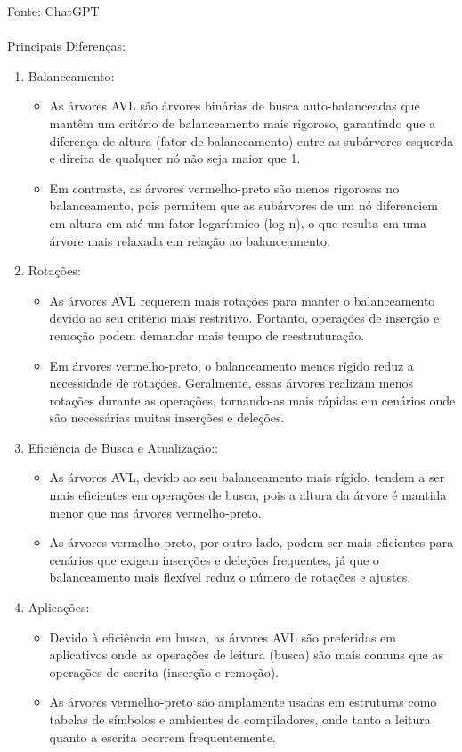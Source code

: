 \documentclass{article}
\begin{document}
Fonte: ChatGPT
\\
\\Principais Diferenças:
  \begin{enumerate}[label=\alph*)]
    \item Balanceamento: 
    \begin{itemize}
      \item As árvores AVL são árvores binárias de busca auto-balanceadas que mantêm um critério de balanceamento mais rigoroso, garantindo que a diferença de altura (fator de balanceamento) entre as subárvores esquerda e direita de qualquer nó não seja maior que 1.
      \item Em contraste, as árvores vermelho-preto são menos rigorosas no balanceamento, pois permitem que as subárvores de um nó diferenciem em altura em até um fator logarítmico (log n), o que resulta em uma árvore mais relaxada em relação ao balanceamento.
    \end{itemize}
    \item Rotações:
      \begin{itemize}
        \item As árvores AVL requerem mais rotações para manter o balanceamento devido ao seu critério mais restritivo. Portanto, operações de inserção e remoção podem demandar mais tempo de reestruturação.
        \item Em árvores vermelho-preto, o balanceamento menos rígido reduz a necessidade de rotações. Geralmente, essas árvores realizam menos rotações durante as operações, tornando-as mais rápidas em cenários onde são necessárias muitas inserções e deleções.
      \end{itemize}
    \item Eficiência de Busca e Atualização::
      \begin{itemize}
        \item As árvores AVL, devido ao seu balanceamento mais rígido, tendem a ser mais eficientes em operações de busca, pois a altura da árvore é mantida menor que nas árvores vermelho-preto.
        \item As árvores vermelho-preto, por outro lado, podem ser mais eficientes para cenários que exigem inserções e deleções frequentes, já que o balanceamento mais flexível reduz o número de rotações e ajustes.
      \end{itemize}
    \item Aplicações:
      \begin{itemize}
        \item Devido à eficiência em busca, as árvores AVL são preferidas em aplicativos onde as operações de leitura (busca) são mais comuns que as operações de escrita (inserção e remoção).
        \item As árvores vermelho-preto são amplamente usadas em estruturas como tabelas de símbolos e ambientes de compiladores, onde tanto a leitura quanto a escrita ocorrem frequentemente.
      \end{itemize}
  \end{enumerate}
\end{document}
